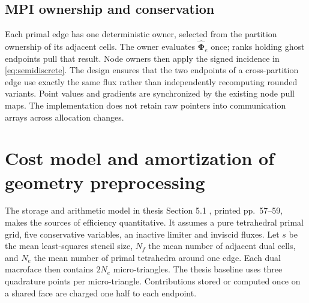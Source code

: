 \documentclass[11pt]{article}
\begin{document}
\begin{table}[t]
\centering
\caption{Runtime representation of the two implementations.  The reconstruction solve is quadratic in both paths; ``rows'' are nonconstant reconstruction rows per solution component.}
\label{tab:representation}
\small
{}
\end{table}

\subsection{MPI ownership and conservation}\label{sec:mpi}

Each primal edge has one deterministic owner, selected from the partition ownership of its adjacent cells.  The owner evaluates $\widehat{\bm\Phi}_e$ once; ranks holding ghost endpoints pull that result.  Node owners then apply the signed incidence in \eqref{eq:semidiscrete}.  The design ensures that the two endpoints of a cross-partition edge use exactly the same flux rather than independently recomputing rounded variants.  Point values and gradients are synchronized by the existing node pull maps.  The implementation does not retain raw pointers into communication arrays across allocation changes.

\section{Cost model and amortization of geometry preprocessing}\label{sec:cost}

The storage and arithmetic model in thesis Section 5.1 \cite{ma2026thesis}, printed pp.~57--59, makes the sources of efficiency quantitative.  It assumes a pure tetrahedral primal grid, five conservative variables, an inactive limiter and inviscid fluxes.  Let $s$ be the mean least-squares stencil size, $N_f$ the mean number of adjacent dual cells, and $N_e$ the mean number of primal tetrahedra around one edge.  Each dual macroface then contains $2N_e$ micro-triangles.  The thesis baseline uses three quadrature points per micro-triangle.  Contributions stored or computed once on a shared face are charged one half to each endpoint.
\end{document}
